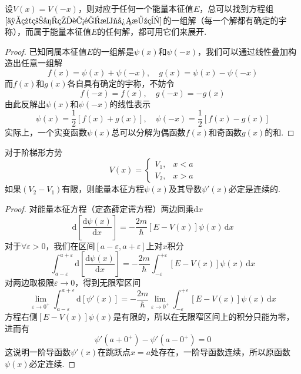 \begin{theorem}\label{定理4}
    设$V(x)=V(-x)$，则对应于任何一个能量本征值$E$，总可以找到方程组$\eqref{一维粒子的能量本征方程}$的一组解（每一个解都有确定的宇称），而属于能量本征值$E$的任何解，都可用它们来展开.
\end{theorem}
\begin{proof}
    已知同属本征值$E$的一组解是$\psi(x)$和$\psi(-x)$，我们可以通过线性叠加构造出任意一组解
    $$
        f(x)=\psi(x)+\psi(-x), \quad g(x)=\psi(x)-\psi(-x)
    $$
    而$f(x)$和$g(x)$各自具有确定的宇称，不妨令
    $$
        f(-x)=f(x), \quad g(-x)=-g(x)
    $$
    由此反解出$\psi(x)$和$\psi(-x)$的线性表示
    $$
        \psi(x)=\frac{1}{2}[f(x)+g(x)], \quad \psi(-x)=\frac{1}{2}[f(x)-g(x)]
    $$
    实际上，一个实变函数$\psi(x)$总可以分解为偶函数$f(x)$和奇函数$g(x)$的和.
\end{proof}




\begin{theorem}\label{定理5}
    对于阶梯形方势
    $$
        V(x) = \begin{cases}
            V_1, & x<a \\
            V_2, & x>a
        \end{cases}
    $$
    如果$(V_2-V_1)$有限，则能量本征方程$\psi(x)$及其导数$\psi'(x)$必定是连续的.
\end{theorem}
\begin{proof}
    对能量本征方程（定态薛定谔方程）两边同乘$\mathrm{d}x$
    $$
        \mathrm{d}\left[\frac{\mathrm{d}\psi(x)}{\mathrm{d}x}\right]
        =-\frac{2m}{\hbar}[E-V(x)]\psi(x)\,\mathrm{d}x
    $$
    对于$\forall\varepsilon>0$，我们在区间$[a-\varepsilon, a+\varepsilon]$上对$x$积分
    $$
        \int_{a-\varepsilon}^{a+\varepsilon}\mathrm{d}\left[\frac{\mathrm{d}\psi(x)}{\mathrm{d}x}\right]
        =-\frac{2m}{\hbar}\int_{-\varepsilon}^{+\varepsilon}[E-V(x)]\psi(x)\,\mathrm{d}x
    $$
    对两边取极限$\varepsilon \to 0$，得到无限窄区间
    $$
        \lim_{\varepsilon\to0^+}\int_{a-\varepsilon}^{a+\varepsilon}\mathrm{d}\left[\psi'(x)\right]
        =-\frac{2m}{\hbar}\lim_{\varepsilon\to0^+}\int_{-\varepsilon}^{+\varepsilon}[E-V(x)]\psi(x)\,\mathrm{d}x
    $$
    方程右侧$[E-V(x)]\psi(x)$是有限的，所以在无限窄区间上的积分只能为零，进而有
    $$
        \psi'(a+0^+)-\psi'(a-0^+)=0
    $$
    这说明一阶导函数$\psi'(x)$在跳跃点$x=a$处存在，一阶导函数连续，所以原函数$\psi(x)$必定连续.
\end{proof}





